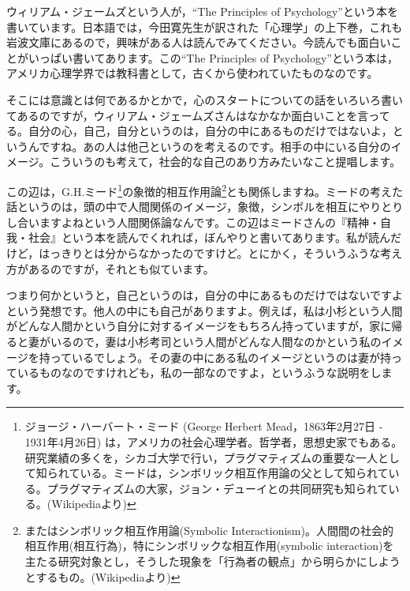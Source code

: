 \documentclass{ltjsbook}
\begin{document}
ウィリアム・ジェームズという人が，``The Principles of Psychology''という本を書いています\parencite{WJames}。日本語では，今田寛先生が訳された「心理学」の上下巻，これも岩波文庫にあるので，興味がある人は読んでみてください。今読んでも面白いことがいっぱい書いてあります。この``The Principles of Psychology''という本は，アメリカ心理学界では教科書として，古くから使われていたものなのです。

そこには意識とは何であるかとかで，心のスタートについての話をいろいろ書いてあるのですが，ウィリアム・ジェームズさんはなかなか面白いことを言ってる。自分の心，自己，自分というのは，自分の中にあるものだけではないよ，というんですね。あの人は他己というのを考えるのです。相手の中にいる自分のイメージ。こういうのも考えて，社会的な自己のあり方みたいなこと提唱します。

この辺は，G.H.ミード\footnote{ジョージ・ハーバート・ミード (George Herbert Mead，1863年2月27日 - 1931年4月26日) は，アメリカの社会心理学者。哲学者，思想史家でもある。研究業績の多くを，シカゴ大学で行い，プラグマティズムの重要な一人として知られている。ミードは，シンボリック相互作用論の父として知られている。プラグマティズムの大家，ジョン・デューイとの共同研究も知られている。(Wikipediaより)}の象徴的相互作用論\footnote{またはシンボリック相互作用論(Symbolic Interactionism)。人間間の社会的相互作用(相互行為)，特にシンボリックな相互作用(symbolic interaction)を主たる研究対象とし，そうした現象を「行為者の観点」から明らかにしようとするもの。(Wikipediaより)}とも関係しますね。ミードの考えた話というのは，頭の中で人間関係のイメージ，象徴，シンボルを相互にやりとりし合いますよねという人間関係論なんです。この辺はミードさんの『精神・自我・社会』という本\parencite{GHMead}を読んでくれれば，ぼんやりと書いてあります。私が読んだけど，はっきりとは分からなかったのですけど。とにかく，そういうふうな考え方があるのですが，それとも似ています。

つまり何かというと，自己というのは，自分の中にあるものだけではないですよという発想です。他人の中にも自己がありますよ。例えば，私は小杉という人間がどんな人間かという自分に対するイメージをもちろん持っていますが，家に帰ると妻がいるので，妻は小杉考司という人間がどんな人間なのかという私のイメージを持っているでしょう。その妻の中にある私のイメージというのは妻が持っているものなのですけれども，私の一部なのですよ，というふうな説明をします。
\end{document}

